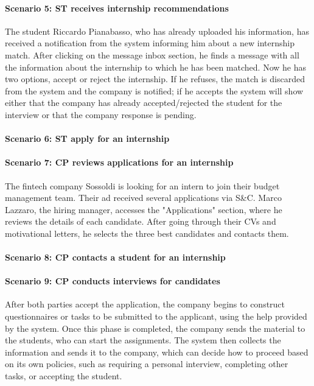 \paragraph{Scenario 5: ST receives internship recommendations}
The student Riccardo Pianabasso, who has already uploaded his information, has received a notification from the system informing him about a new internship match. After clicking on the message inbox section, he finds a message with all the information about the internship to which he has been matched. Now he has two options, accept or reject the internship. If he refuses, the match is discarded from the system and the company is notified; if he accepts the system will show either that the company has already accepted/rejected the student for the interview or that the company response is pending.

\paragraph{Scenario 6: ST apply for an internship}

\paragraph{Scenario 7: CP reviews applications for an internship}
The fintech company Sossoldi is looking for an intern to join their budget management team. Their ad received several applications via S\&C. Marco Lazzaro, the hiring manager, accesses the "Applications" section, where he reviews the details of each candidate. After going through their CVs and motivational letters, he selects the three best candidates and contacts them.

\paragraph{Scenario 8: CP contacts a student for an internship}

\paragraph{Scenario 9: CP conducts interviews for candidates}
After both parties accept the application, the company begins to construct questionnaires or tasks to be submitted to the applicant, using the help provided by the system. Once this phase is completed, the company sends the material to the students, who can start the assignments. The system then collects the information and sends it to the company, which can decide how to proceed based on its own policies, such as requiring a personal interview, completing other tasks, or accepting the student.

